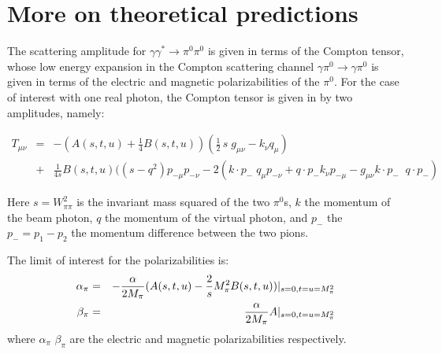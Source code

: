 \def\red{\color{red}}
\def\blue{\color{blue}}
\def\green{\color{green}}
\def\violet{\color{violet}}
\def\orange{\color{orange}}
\newcommand{\fr}{\frac}
\newcommand{\beq}{\begin{equation}}
\newcommand{\eeq}{\end{equation}}
\newcommand{\bea}{\begin{eqnarray}}
\newcommand{\eea}{\end{eqnarray}}
\newcommand{\zero}{{(0)}}
\newcommand{\one}{{(1)}}
\newcommand{\eps}{\epsilon}
\newcommand{\ord}[1]{{\cal{O}}( #1 )}
\newcommand{\B}{{\bf B}}
\newcommand{\Bdag}{{\bf B^\dagger}}
\newcommand{\cgsu}[3]{ \langle #1 #2 \mid #3\rangle}
\newcommand{\water}[2]{ #1,$^2$,#2}
\def \ba{\begin{eqnarray}}\def\ea{\end{eqnarray}}
\def\bc{\begin{center}}\def\ec{\end{center}}
\def\nn{\nonumber\\}\def\v{\vec}

\section{More on theoretical predictions}

The scattering amplitude for $\gamma\gamma^*\to\pi^0\pi^0$ is given in
terms of the Compton tensor, whose low energy expansion in the Compton
scattering channel $\gamma\pi^0\to\gamma\pi^0$ is given in terms of
the electric and magnetic polarizabilities of the $\pi^0$. For the
case of interest with one real photon, the Compton tensor is given in
by two amplitudes, namely:
   
   \bea
   T_{\mu\nu}&=&-(A(s,t,u)+\frac 14 B(s,t,u)) (\frac 12\, s \;g_{\mu\nu}-k_\nu q_\mu)\\
   &+&\frac{1}{4s} B(s,t,u)  ( (s-q^2) p_{-\mu} p_{-\nu}-2(k\cdot p_-\; q_\mu p_{-\nu}+q\cdot p_{-} k_\nu p_{-\mu}-g_{\mu\nu} k \cdot p_-\; \;q\cdot p_-)
   \eea

Here $s=W_{\pi\pi}^2$ is the invariant mass squared of the two
$\pi^0$s, $k$ the momentum of the beam photon, $q$ the momentum of the
virtual photon, and $p_-$ the $p_-=p_1-p_2$ the momentum difference
between the two pions.
  
  The limit of interest for the polarizabilities is:
  \bea
 \alpha_{\pi}&=& - \frac{\alpha}{2 M_\pi}  (A(s,t,u)-\frac 2 s M_\pi^2 B(s,t,u))\arrowvert_{s=0, t=u=M_\pi^2}\nonumber\\
 \beta_{\pi}&=&
  \frac{\alpha}{2 M_\pi} A\arrowvert_{s=0, t=u=M_\pi^2}
  \eea
  where $ \alpha_{\pi}$ $ \beta_{\pi}$ are the electric and magnetic polarizabilities respectively.
  
